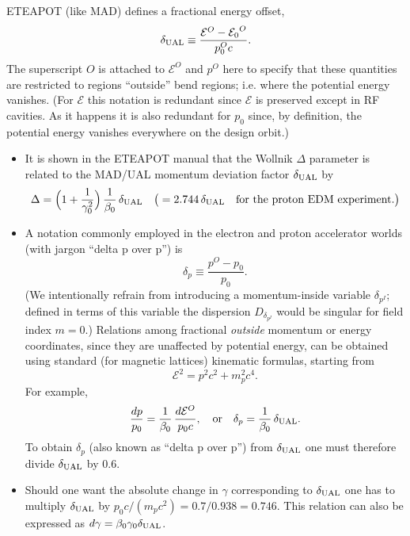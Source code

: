 \documentclass[]{article}
\begin{document}
ETEAPOT (like MAD) defines a fractional energy offset,
%
\begin{equation}
\delta_{\rm UAL} 
 \equiv 
\frac{{\mathcal E}^O-{\mathcal E_0}^O}{p_0^Oc}.
\label{eq:Offset.2}
\end{equation}
%
The superscript $O$ is attached to ${\mathcal E}^O$ and $p^O$ here to specify 
that these quantities are restricted to regions ``outside'' bend regions;
i.e. where the potential energy vanishes. (For ${\mathcal E}$ this notation
is redundant since ${\mathcal E}$ is preserved except in RF cavities. As it
happens it is also redundant for $p_0$ since, by definition, the potential
energy vanishes everywhere on the design orbit.)
%
\begin{itemize}
\item
It is shown in the ETEAPOT manual that the Wollnik
$\Delta$ parameter is related to the MAD/UAL momentum deviation 
factor $\delta_{\rm UAL}$ by
%
\begin{equation}
\Delta 
 =
\Big(1 + \frac{1}{\gamma_0^2}\Big)\,\frac{1}{\beta_0}\,\delta_{\rm UAL}
\quad
\big(
 = 
2.744\,\delta_{\rm UAL}
\quad\hbox{for\ the\ proton\ EDM\ experiment.} 
\big)
\label{eq:chromatic.6q}
\end{equation}
%
\item
A notation commonly employed in the electron and proton accelerator 
worlds (with jargon ``delta p over p'') is
%
\begin{equation}
\delta_p
 \equiv 
\frac{p^O-p_0}{p_0}.
\label{eq:Offset.4}
\end{equation}
%
(We intentionally refrain from introducing a
momentum-inside variable $\delta_{p^I}$; defined in terms of this variable the
dispersion $D_{\delta_{p^I}}$ would be singular for field index $m=0$.)
Relations among fractional \emph{outside} momentum or energy coordinates,
since they are unaffected by potential energy, can be
obtained using standard (for magnetic lattices) kinematic
formulas, starting from
%
\begin{equation}
{\mathcal{E}}^2 = p^2c^2 + m_p^2c^4.
\label{eq:Offset.9}
\end{equation}
%
For example,
%
\begin{equation}
\frac{dp}{p_0}
 =
\frac{1}{\beta_0}\,
\frac{d\mathcal{E}^O}{p_0c},
\quad\hbox{or}\quad
\delta_p = \frac{1}{\beta_0}\,\delta_{\rm UAL}.
\label{eq:Offset.10}
\end{equation}
%
To obtain $\delta_p$ (also known as ``delta p over p'') from 
$\delta_{\rm UAL}$ one must therefore divide $\delta_{\rm UAL}$ by 0.6.
\item
Should one want the absolute change in $\gamma$ corresponding to $\delta_{\rm UAL}$
one has to multiply $\delta_{\rm UAL}$ by $p_0c/(m_pc^2)=0.7/0.938=0.746$.
This relation can also be expressed as 
$d\gamma=\beta_0\gamma_0\delta_{\rm UAL}$.
\end{itemize}
%
\end{document}
